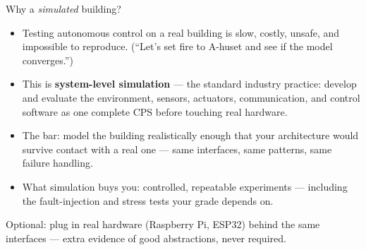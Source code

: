 \documentclass[aspectratio=169]{beamer}
\newcommand{\hilite}[1]{\textcolor{accentColor}{#1}}
\newcommand{\subtle}[1]{\textcolor{subtleColor}{#1}}
\begin{document}
\begin{frame}{Why a \emph{simulated} building?}
	\begin{itemize}
		\setlength\itemsep{0.7em}
		\item Testing autonomous control on a real building is \hilite{slow, costly, unsafe}, and
		impossible to reproduce. \subtle{(``Let's set fire to A-huset and see if the model converges.'')}
		\item This is \textbf{system-level simulation} — the standard industry practice: develop and
		evaluate the environment, sensors, actuators, communication, and control software
		\hilite{as one complete CPS} before touching real hardware.
		\item The bar: model the building \hilite{realistically enough} that your architecture would
		survive contact with a real one — same interfaces, same patterns, same failure handling.
		\item What simulation buys you: \hilite{controlled, repeatable experiments} — including the
		fault-injection and stress tests your grade depends on.
	\end{itemize}
	\vspace{0.4em}
	\centering\small\subtle{Optional: plug in real hardware (Raspberry Pi, ESP32) behind the same
	interfaces — extra evidence of good abstractions, never required.}
\end{frame}
\end{document}
